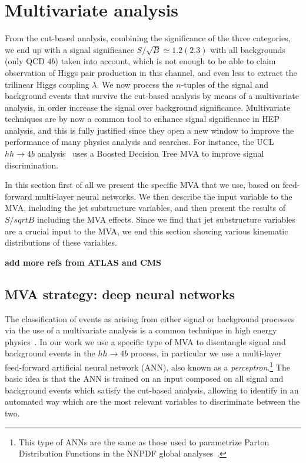 
\section{Multivariate analysis}
\label{sec:mva}

From the cut-based analysis,
combining the significance of the three categories,
we end up with a signal significance $S/\sqrt{B}\simeq 1.2(2.3)$
with all backgrounds (only QCD $4b$) taken into account,
which is not enough to be able to claim observation
of Higgs pair production
in this channel, and even less to extract the trilinear Higgs  coupling
$\lambda$.
%
We now process  the $n$-tuples of the signal and background
events that survive the cut-based
analysis by means of a multivariate
analysis, in order increase the signal over background
significance.
%
Multivariate techniques are by now a common tool to enhance signal
significance in HEP analysis, and this is fully justified
since they open a new window to improve the performance
of many physics analysis and searches.
%
For instance, the UCL $hh\to 4b$ analysis~\cite{Wardrope:2014kya}
uses a Boosted
Decision Tree MVA to improve signal discrimination.

In this section first of all we present the specific MVA that we use,
based on feed-forward multi-layer neural networks.
%
We then describe the input variable to the MVA, including the jet substructure
variables, and then present the results of $S/sqrt{B}$ including
the MVA effects.
%
Since we find that jet substructure variables are a crucial input
to the MVA, we end this section showing various kinematic distributions
of these variables.

{\bf add more refs from ATLAS and CMS}

\subsection{MVA strategy: deep neural networks}

The classification of events as arising from either signal or
background processes via the use of a multivariate analysis is a common
technique in high energy physics~\cite{Baldi:2014pta,Wardrope:2014kya,Chatrchyan:2013zna}.
%
In our work we use a specific type of  MVA to
disentangle signal and background events in the $hh\to 4b$ process,
in particular we use a multi-layer feed-forward artificial neural network (ANN),
also known as a {\it perceptron}.\footnote{This type of ANNs are the same
  as those used to parametrize Parton Distribution Functions
in the NNPDF global analyses~\cite{DelDebbio:2004qj,Ball:2008by,Ball:2011mu,Ball:2010de}.}
%
The basic idea is that the ANN is trained on an input composed on
all  signal and background
events which satisfy the
cut-based analysis, allowing to identify in an automated way
which are the most relevant variables to discriminate between the two.

